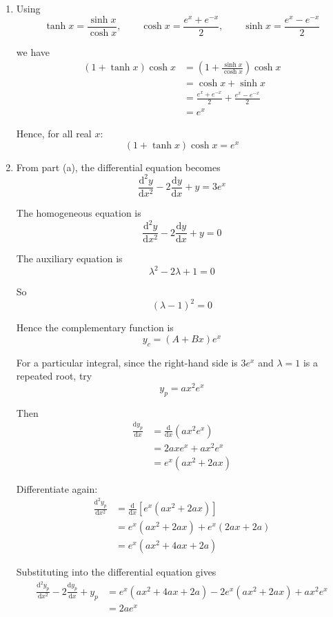 \documentclass[leqno]{article}
\begin{document}
\begin{enumerate}[
  label=\textbf{\arabic*.},
  leftmargin=*,
  topsep=0pt,
  partopsep=0pt,
  parsep=0pt
]
\vspace*{10pt}

\begin{djsSolution}
\begin{enumerate}[label=\textbf{(\alph*)}]
  \item Using
\[
\tanh x=\frac{\sinh x}{\cosh x},\qquad
\cosh x=\frac{e^x+e^{-x}}{2},\qquad
\sinh x=\frac{e^x-e^{-x}}{2}
\]

we have
\begin{align*}
(1+\tanh x)\cosh x
&=\left(1+\frac{\sinh x}{\cosh x}\right)\cosh x \\
&=\cosh x+\sinh x \\
&=\frac{e^x+e^{-x}}{2}+\frac{e^x-e^{-x}}{2} \\
&=e^x
\end{align*}

Hence, for all real \(x\):
\[
(1+\tanh x)\cosh x=e^x
\]

\item From part (a), the differential equation becomes
\[
\frac{\mathrm{d}^2 y}{\mathrm{d}x^2}-2\frac{\mathrm{d}y}{\mathrm{d}x}+y=3e^x
\]

The homogeneous equation is
\[
\frac{\mathrm{d}^2 y}{\mathrm{d}x^2}-2\frac{\mathrm{d}y}{\mathrm{d}x}+y=0
\]

The auxiliary equation is
\[
\lambda^2-2\lambda+1=0
\]

So
\[
(\lambda-1)^2=0
\]

Hence the complementary function is
\[
y_c=(A+Bx)e^x
\]

For a particular integral, since the right-hand side is $3e^x$ and $\lambda=1$ is a repeated root, try
\[
y_p=ax^2e^x
\]

Then
\begin{align*}
\frac{\mathrm{d}y_p}{\mathrm{d}x}
&= \frac{\mathrm{d}}{\mathrm{d}x}\left(ax^2e^x\right) \\
&= 2axe^x+ax^2e^x \\
&= e^x\left(ax^2+2ax\right)
\end{align*}

Differentiate again:
\begin{align*}
\frac{\mathrm{d}^2y_p}{\mathrm{d}x^2}
&= \frac{\mathrm{d}}{\mathrm{d}x}\left[e^x\left(ax^2+2ax\right)\right] \\
&= e^x\left(ax^2+2ax\right)+e^x\left(2ax+2a\right) \\
&= e^x\left(ax^2+4ax+2a\right)
\end{align*}

Substituting into the differential equation gives
\begin{align*}
\frac{\mathrm{d}^2y_p}{\mathrm{d}x^2}-2\frac{\mathrm{d}y_p}{\mathrm{d}x}+y_p
&= e^x\left(ax^2+4ax+2a\right)-2e^x\left(ax^2+2ax\right)+ax^2e^x \\
&= 2ae^x
\end{align*}


\end{enumerate}
\end{djsSolution}
\end{enumerate}
\end{document}
